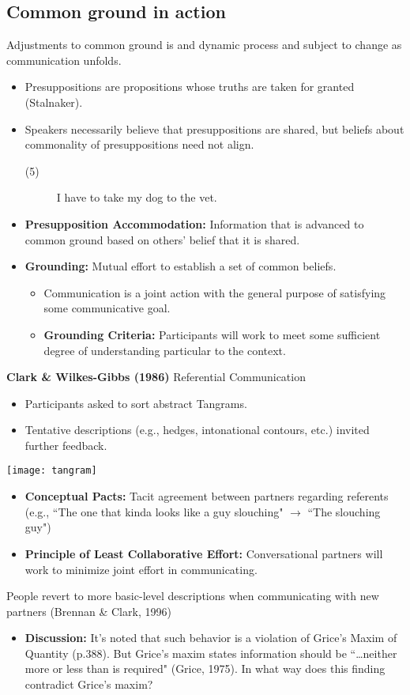 \documentclass{article}
\begin{document}
\begin{multicols}{2}
\subsection{Common ground in action}
Adjustments to common ground is and dynamic process and subject to change as communication unfolds.
\begin{itemize}
	\item Presuppositions are propositions whose truths are taken for granted (Stalnaker). 
	\item Speakers necessarily believe that presuppositions are shared, but beliefs about commonality of presuppositions need not align.
	\begin{description}
		\item[(5)] I have to take my dog to the vet.
	\end{description}
	\item \textbf{Presupposition Accommodation:} Information that is advanced to common ground based on others' belief that it is shared.
	\item \textbf{Grounding:} Mutual effort to establish a set of common beliefs.
	\begin{itemize}
		\item Communication is a joint action with the general purpose of satisfying some communicative goal.
		\item \textbf{Grounding Criteria:} Participants will work to meet some sufficient degree of understanding particular to the context.
	\end{itemize} 
\end{itemize}
\textbf{Clark \& Wilkes-Gibbs (1986)} Referential Communication
\begin{itemize}
	\item Participants asked to sort abstract Tangrams.
	\item Tentative descriptions (e.g., hedges, intonational contours, etc.) invited further feedback. 
\end{itemize}
\begin{center}
\texttt{[image: tangram]}
\end{center}
\begin{itemize}
	\item \textbf{Conceptual Pacts:} Tacit agreement between partners regarding referents (e.g., \textquotedblleft The one that kinda looks like a guy slouching" $\longrightarrow$ \textquotedblleft The slouching guy")
	\item \textbf{Principle of Least Collaborative Effort:} Conversational partners will work to minimize joint effort in communicating.
\end{itemize}
People revert to more basic-level descriptions when communicating with new partners (Brennan \& Clark, 1996)
\begin{itemize}
	\item \textbf{Discussion:} It's noted that such behavior is a violation of Grice's Maxim of Quantity (p.388). But Grice's maxim states information should be \textquotedblleft\ldots neither more or less than is required" (Grice, 1975). In what way does this finding contradict Grice's maxim?
\end{itemize}

\end{multicols}
\end{document}

